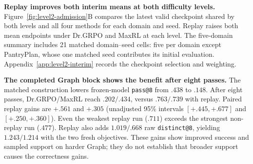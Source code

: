\documentclass{article}
\newcommand{\1}{\mathbf 1}
\theoremstyle{remark}
\theoremstyle{definition}
\theoremstyle{plain}
\begin{document}
\textbf{Replay improves both interim means at both difficulty levels.}
Figure~\ref{fig:level2-admission}B compares the latest valid checkpoint shared
by both levels and all four methods for each domain and seed. Replay raises
both mean endpoints under Dr.GRPO and MaxRL at each level. The five-domain
summary includes 21 matched domain--seed cells: five per domain except
PantryPlan, whose one matched seed contributes its initial evaluation.
Appendix~\ref{app:level2-interim} records the checkpoint selection and weighting.

\textbf{The completed Graph block shows the benefit after eight passes.}
The matched construction lowers frozen-model \texttt{pass@8} from
\(.438\) to \(.148\). After eight passes, Dr.GRPO/MaxRL reach \(.202/.434\),
versus \(.763/.739\) with replay. Paired replay gains are \(+.561\) and
\(+.305\) (unadjusted 95\% intervals \([+.445,+.677]\) and
\([+.250,+.360]\)). Even the weakest replay run (\(.711\)) exceeds the
strongest non-replay run (\(.477\)). Replay also adds \(1.019/.668\) raw
\texttt{distinct@8}, yielding \(1.243/1.214\) with the two fresh objectives.
These gains show improved success and sampled support on harder Graph;
they do not establish that broader support causes the correctness gains.

\long{}
\end{document}
